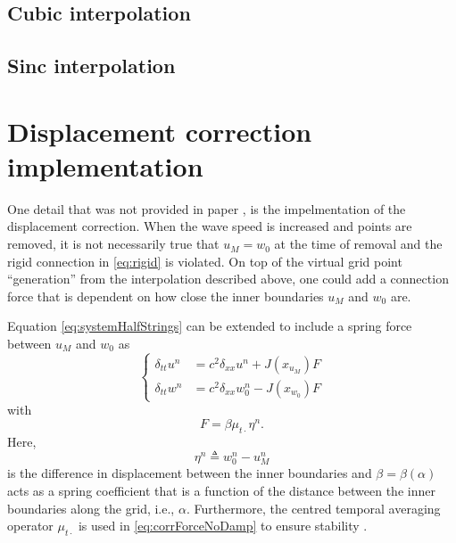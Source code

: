 \subsection{Cubic interpolation}

\subsection{Sinc interpolation}


\section{Displacement correction implementation} 
One detail that was not provided in paper \citeP[G], is the impelmentation of the displacement correction.
When the wave speed is increased and points are removed, it is not necessarily true that $u_M = w_0$ at the time of removal and the rigid connection in \eqref{eq:rigid} is violated. On top of the virtual grid point ``generation'' from the interpolation described above, one could add a connection force that is dependent on how close the inner boundaries $u_M$ and $w_0$ are.

Equation \eqref{eq:systemHalfStrings} can be extended to include a spring force between $u_M$ and $w_0$ as
\begin{equation}\label{eq:dispCorrSyst}
    \begin{cases}
        \delta_{tt}u^n &= c^2\delta_{xx}u^n + J(x_{u_M})F\\
        \delta_{tt}w^n &= c^2\delta_{xx}w_0^n - J(x_{w_0})F
    \end{cases}
\end{equation}
with 
\begin{equation}\label{eq:corrForceNoDamp}
    F = \beta \mu_{t\cdot}\eta^n.
\end{equation}
Here,
\begin{equation}\label{eq:etaCorrDef}
    \eta^n \triangleq w_0^n - u_M^n
\end{equation}
is the difference in displacement between the inner boundaries
and $\beta = \beta(\alpha)$ 
acts as a spring coefficient that is a function of the distance between the inner boundaries along the grid, i.e., $\alpha$. Furthermore, the centred temporal averaging operator $\mu_{t\cdot}$ is used in \eqref{eq:corrForceNoDamp} to ensure stability \cite{Bilbao2009Modular}.

